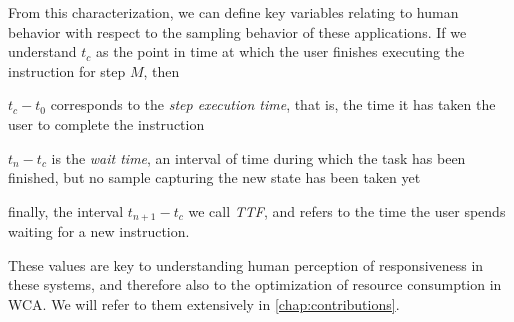 %
From this characterization, we can define key variables relating to human behavior with respect to the sampling behavior of these applications.
If we understand \ensuremath{t_c} as the point in time at which the user finishes executing the instruction for step \ensuremath{M}, then
\begin{inlineenum}
    \item \ensuremath{t_c - t_0} corresponds to the \emph{step execution time}, that is, the time it has taken the user to complete the instruction
    \item \ensuremath{t_n - t_c} is the \emph{wait time}, an interval of time during which the task has been finished, but no sample capturing the new state has been taken yet
    \item finally, the interval \ensuremath{t_{n + 1} - t_c} we call \emph{\gls{TTF}}, and refers to the time the user spends waiting for a new instruction.
\end{inlineenum}
These values are key to understanding human perception of responsiveness in these systems, and therefore also to the optimization of resource consumption in \gls{WCA}.
We will refer to them extensively in \cref{chap:contributions}.

